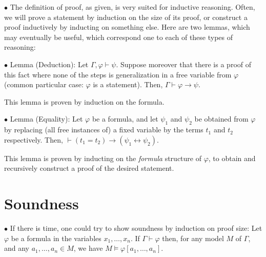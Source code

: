 \documentclass{article}
\newcommand\point[1]{\noindent \hspace{\labelsep} $\bullet$ #1 \smallskip}
\begin{document}
\point{The definition of proof, as given, is very suited for inductive reasoning. Often, we will prove a statement by induction on the size of its proof, or construct a proof inductively by inducting on something else. Here are two lemmas, which may eventually be useful, which correspond one to each of these types of reasoning:}

\point{Lemma (Deduction): Let $\Gamma, \varphi \vdash \psi$. Suppose moreover that there is a proof of this fact where none of the steps is generalization in a free variable from $\varphi$ (common particular case: $\varphi$ is a statement). Then, $\Gamma \vdash \varphi \rightarrow \psi$.

This lemma is proven by induction on the formula.}

\point{Lemma (Equality): Let $\varphi$ be a formula, and let $\psi_1$ and $\psi_2$ be obtained from $\varphi$ by replacing (all free instances of) a fixed variable by the terms $t_1$ and $t_2$ respectively. Then, $\vdash (t_1 = t_2) \rightarrow (\psi_1 \leftrightarrow \psi_2)$.

This lemma is proven by inducting on the \emph{formula} structure of $\varphi$, to obtain and recursively construct a proof of the desired statement.}

\section{Soundness}

\point{If there is time, one could try to show soundness by induction on proof size: Let $\varphi$ be a formula in the variables $x_1, \dots, x_n$. If $\Gamma \vdash \varphi$ then, for any model $M$ of $\Gamma$, and any $a_1, \dots, a_n \in M$, we have $M \vDash \varphi[a_1, \dots, a_n]$.}
\end{document}
